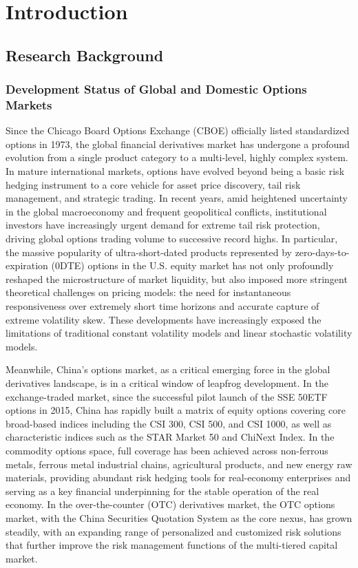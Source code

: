 \chapter{Introduction}
\section{Research Background}
\subsection{Development Status of Global and Domestic Options Markets}
Since the Chicago Board Options Exchange (CBOE) officially listed standardized options in 1973, the global financial derivatives market has undergone a profound evolution from a single product category to a multi-level, highly complex system. In mature international markets, options have evolved beyond being a basic risk hedging instrument to a core vehicle for asset price discovery, tail risk management, and strategic trading. In recent years, amid heightened uncertainty in the global macroeconomy and frequent geopolitical conflicts, institutional investors have increasingly urgent demand for extreme tail risk protection, driving global options trading volume to successive record highs. In particular, the massive popularity of ultra-short-dated products represented by zero-days-to-expiration (0DTE) options in the U.S. equity market has not only profoundly reshaped the microstructure of market liquidity, but also imposed more stringent theoretical challenges on pricing models: the need for instantaneous responsiveness over extremely short time horizons and accurate capture of extreme volatility skew. These developments have increasingly exposed the limitations of traditional constant volatility models and linear stochastic volatility models.

Meanwhile, China's options market, as a critical emerging force in the global derivatives landscape, is in a critical window of leapfrog development. In the exchange-traded market, since the successful pilot launch of the SSE 50ETF options in 2015, China has rapidly built a matrix of equity options covering core broad-based indices including the CSI 300, CSI 500, and CSI 1000, as well as characteristic indices such as the STAR Market 50 and ChiNext Index. In the commodity options space, full coverage has been achieved across non-ferrous metals, ferrous metal industrial chains, agricultural products, and new energy raw materials, providing abundant risk hedging tools for real-economy enterprises and serving as a key financial underpinning for the stable operation of the real economy. In the over-the-counter (OTC) derivatives market, the OTC options market, with the China Securities Quotation System as the core nexus, has grown steadily, with an expanding range of personalized and customized risk solutions that further improve the risk management functions of the multi-tiered capital market.

